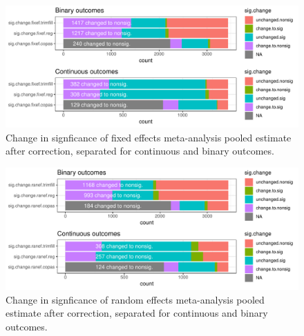\documentclass[11pt,a4paper,twoside]{book}\usepackage[]{graphicx}\usepackage[]{color}
\newenvironment{knitrout}{}{} %
\begin{document}
\begin{figure}
\begin{knitrout}
\color{fgcolor}

{\centering \includegraphics[width=\textwidth-3cm]{figure/ch02_figunnamed-chunk-32-1} 

}



\end{knitrout}
\caption{Change in signficance of fixed effects meta-analysis pooled estimate after correction, separated for continuous and binary outcomes.}
\label{significance.change.fixed.sep}
\end{figure}

\begin{figure}
\begin{knitrout}
\color{fgcolor}

{\centering \includegraphics[width=\textwidth-3cm]{figure/ch02_figunnamed-chunk-33-1} 

}



\end{knitrout}
\caption{Change in signficance of random effects meta-analysis pooled estimate after correction, separated for continuous and binary outcomes.}
\label{significance.change.random}
\end{figure}
\end{document}
